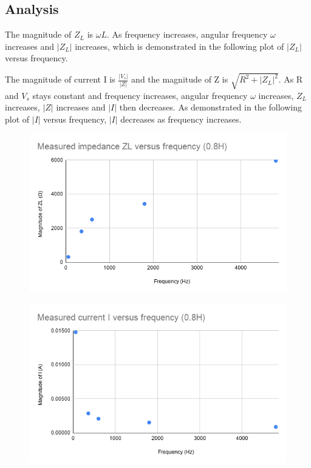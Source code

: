 \documentclass{article}
\begin{document}
\subsection*{Analysis}
The magnitude of $Z_L$ is $\omega L$. As frequency increases, angular frequency $\omega$ increases and $|Z_L|$ increases, which is demonstrated in the following plot of $|Z_L|$ versus frequency.

The magnitude of current I is $\frac{|V_s|}{|Z|}$ and the magnitude of Z is $\sqrt{R^2+|Z_L|^2}$. As R and $V_s$ stays constant and frequency increases, angular frequency $\omega$ increases, $Z_L$ increases, $|Z|$ increases and $|I|$ then decreases. As demonstrated in the following plot of $|I|$ versus frequency, $|I|$ decreases as frequency increases.

\begin{figure}[H]
    \centering
        \includegraphics[scale=0.5]{ZvF_0.8H.png}
\end{figure}
\begin{figure}[H]
    \centering
        \includegraphics[scale=0.5]{IvF_0.8H.png}
\end{figure}
\end{document}
